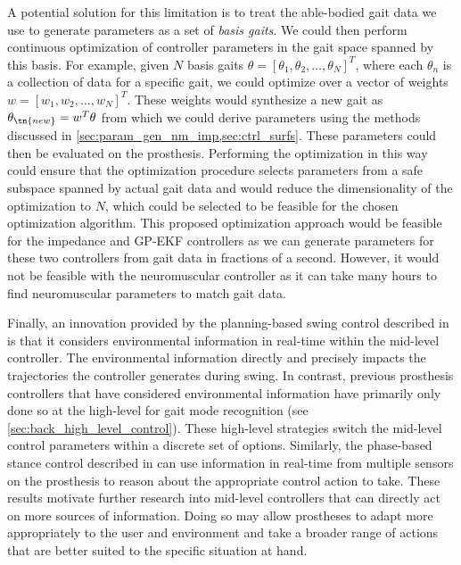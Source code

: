 A potential solution for this limitation is to treat the able-bodied gait data
we use to generate parameters as a set of \emph{basis gaits}. We could then
perform continuous optimization of controller parameters in the gait space
spanned by this basis. For example, given $N$ basis gaits $\theta = [\theta_1,
\theta_2, \ldots, \theta_N]^T$, where each $\theta_n$ is a collection of data
for a specific gait, we could optimize over a vector of weights $w = [w_1, w_2,
\ldots, w_N]^T$. These weights would synthesize a new gait as $\theta_\tn{new} =
w^T \theta$ from which we could derive parameters using the methods discussed in
\cref{sec:param_gen_nm_imp,sec:ctrl_surfs}. These parameters could then be
evaluated on the prosthesis. Performing the optimization in this way could
ensure that the optimization procedure selects parameters from a safe subspace
spanned by actual gait data and would reduce the dimensionality of the
optimization to $N$, which could be selected to be feasible for the chosen
optimization algorithm. This proposed optimization approach would be feasible
for the impedance and GP-EKF controllers as we can generate parameters for these
two controllers from gait data in fractions of a second. However, it would not
be feasible with the neuromuscular controller as it can take many hours to find
neuromuscular parameters to match gait data.

Finally, an innovation provided by the planning-based swing control described in
is that it considers environmental information in real-time within the mid-level
controller. The environmental information directly and precisely impacts the
trajectories the controller generates during swing. In contrast, previous
prosthesis controllers that have considered environmental information have
primarily only done so at the high-level for gait mode recognition (see
\cref{sec:back_high_level_control}). These high-level strategies switch the
mid-level control parameters within a discrete set of options. Similarly, the
phase-based stance control described in
can use information in real-time from multiple sensors on the prosthesis to
reason about the appropriate control action to take. These results motivate
further research into mid-level controllers that can directly act on more
sources of information. Doing so may allow prostheses to adapt more
appropriately to the user and environment and take a broader range of actions
that are better suited to the specific situation at hand. 

